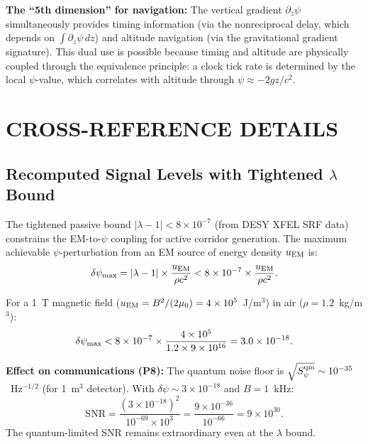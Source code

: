 \documentclass[aps,prd,twocolumn,superscriptaddress,nofootinbib]{revtex4-2}
\begin{document}
\textbf{The ``5th dimension'' for navigation:}  The vertical gradient
$\partial_z\psi$ simultaneously provides timing information (via the
nonreciprocal delay, which depends on $\int\partial_z\psi\,dz$) and
altitude navigation (via the gravitational gradient signature).  This
dual use is possible because timing and altitude are physically
coupled through the equivalence principle: a clock tick rate is
determined by the local $\psi$-value, which correlates with altitude
through $\psi \approx -2gz/c^2$.

\section{CROSS-REFERENCE DETAILS}

\subsection{Recomputed Signal Levels with Tightened $\lambda$ Bound}

The tightened passive bound $|\lambda-1| < 8\times10^{-7}$ (from DESY XFEL
SRF data) constrains the EM-to-$\psi$ coupling for active corridor
generation.  The maximum achievable $\psi$-perturbation from an EM source
of energy density $u_{\rm EM}$ is:
\begin{equation}
\delta\psi_{\rm max} = |\lambda-1|\times\frac{u_{\rm EM}}{\rho c^2}
< 8\times10^{-7}\times\frac{u_{\rm EM}}{\rho c^2}.
\end{equation}

For a 1~T magnetic field ($u_{\rm EM} = B^2/(2\mu_0) = 4\times10^5$~J/m$^3$)
in air ($\rho = 1.2$~kg/m$^3$):
\begin{equation}
\delta\psi_{\rm max} < 8\times10^{-7}\times\frac{4\times10^5}
{1.2\times9\times10^{16}} = 3.0\times10^{-18}.
\end{equation}

\textbf{Effect on communications (P8):}  The quantum noise floor is
$\sqrt{S_\psi^{\rm qm}} \sim 10^{-35}$~Hz$^{-1/2}$ (for 1~m$^3$
detector).  With $\delta\psi \sim 3\times10^{-18}$ and $B = 1$~kHz:
\begin{equation}
\text{SNR} = \frac{(3\times10^{-18})^2}{10^{-69}\times10^3}
= \frac{9\times10^{-36}}{10^{-66}} = 9\times10^{30}.
\end{equation}
The quantum-limited SNR remains extraordinary even at the $\lambda$ bound.
\end{document}

